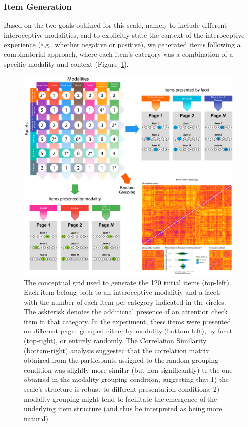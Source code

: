 \documentclass[
  jou,
  floatsintext,
  longtable,
  nolmodern,
  notxfonts,
  notimes,
  colorlinks=true,linkcolor=blue,citecolor=blue,urlcolor=blue]{apa7}
\begin{document}
\subsubsection{Item Generation}\label{item-generation}

Based on the two goals outlined for this scale, namely to include
different interoceptive modalities, and to explicitly state the context
of the interoceptive experience (e.g., whether negative or positive), we
generated items following a combinatorial approach, where each item's
category was a combination of a specific modality and context
(Figure~\ref{fig-one}).

\begin{figure}[!htbp]

{\caption{{The conceptual grid used to generate the 120 initial items
(top-left). Each item belong both to an interoceptive modalitiy and a
facet, with the number of each item per category indicated in the
circles. The askterisk denotes the additional presence of an attention
check item in that category. In the experiment, these items were
presented on different pages grouped either by modality (bottom-left),
by facet (top-right), or entirely randomly. The Correlation Similarity
(bottom-right) analysis suggested that the correlation matrix obtained
from the participants assigned to the random-grouping condition was
slightly more similar (but non-significantly) to the one obtained in the
modality-grouping condition, suggesting that 1) the scale's structure is
robust to different presentation conditions; 2) modality-grouping might
tend to facilitate the emergence of the underlying item structure (and
thus be interpreted as being more natural).}{\label{fig-one}}}}

\begin{center}
\includegraphics[width=1\linewidth,height=\textheight,keepaspectratio]{../study1/analysis/figures/figure1.png}
\end{center}

\end{figure}
\end{document}
